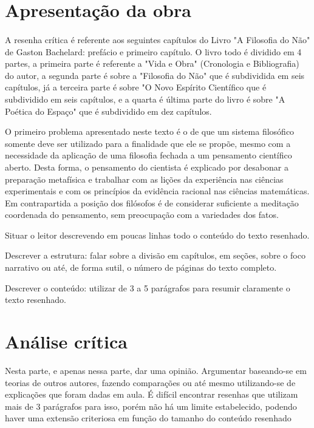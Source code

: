 \documentclass[11pt]{article}
\begin{document}
\section{Apresentação da obra}

\paragraph{}
A resenha crítica é referente aos seguintes capítulos do Livro "A Filosofia do Não" de Gaston Bachelard: prefácio e primeiro capítulo. O livro todo é dividido em 4 partes, a primeira parte é referente a "Vida e Obra" (Cronologia e Bibliografia) do autor, a segunda parte é sobre a "Filosofia do Não" que é subdividida em seis capítulos, já a terceira parte é sobre "O Novo Espírito Científico que é subdividido em seis capítulos, e a quarta é última parte do livro é sobre "A Poética do Espaço" que é subdividido em dez capítulos. 



O primeiro problema apresentado neste texto é o de que um sistema filosófico somente deve ser utilizado para a finalidade que ele se propõe, mesmo com a necessidade da aplicação de uma filosofia fechada a um pensamento científico aberto. Desta forma, o pensamento do cientista é explicado por desabonar a preparação metafísica e trabalhar com as lições da experiência nas ciências experimentais e com os princípios da evidência racional nas ciências matemáticas. Em contrapartida a posição dos filósofos é de considerar suficiente a meditação coordenada do pensamento, sem preocupação com a variedades dos fatos.


Situar o leitor descrevendo em poucas linhas todo o conteúdo do texto resenhado.

Descrever a estrutura: falar sobre a divisão em capítulos, em seções, sobre o foco narrativo ou até, de forma sutil, o número de páginas do texto completo.

Descrever o conteúdo: utilizar de 3 a 5 parágrafos para resumir claramente o texto resenhado.

\section{Análise crítica}
Nesta parte, e apenas nessa parte, dar uma opinião. Argumentar baseando-se em teorias de outros autores, fazendo comparações ou até mesmo utilizando-se de explicações que foram dadas em aula. É difícil encontrar resenhas que utilizam mais de 3 parágrafos para isso, porém não há um limite estabelecido, podendo haver uma extensão criteriosa em função do tamanho do conteúdo resenhado
\end{document}
